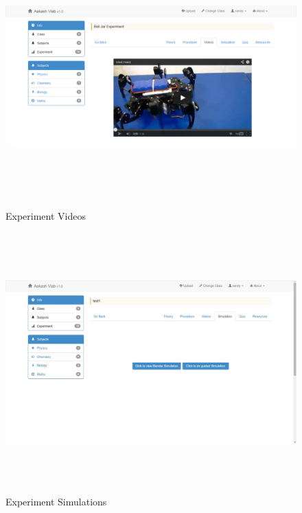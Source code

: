 \documentclass[12pt]{report}
\begin{document}
\begin{figure}[H]
 \centering 
 \includegraphics[width=15cm, height=10cm]{./307.jpg}
 \caption{Experiment Videos\label{fig:307}}
\end{figure}
\begin{figure}[H]
 \centering 
 \includegraphics[width=15cm, height=10cm]{./308.jpg}
 \caption{Experiment Simulations \label{fig:308}}
\end{figure}
\end{document}
